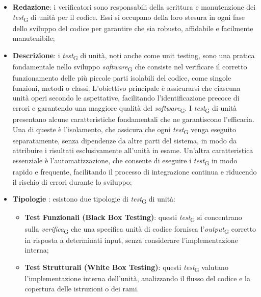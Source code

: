 \begin{itemize}
    \item \textbf{Redazione}: i verificatori sono responsabili della scrittura e manutenzione dei \textit{test}\textsubscript{G} di unità per il codice. Essi si occupano della loro stesura in ogni fase dello sviluppo del codice per garantire che sia robusto, affidabile e facilmente manutenibile;
    \item \textbf{Descrizione}: i \textit{test}\textsubscript{G} di unità, noti anche come unit testing, sono una pratica fondamentale nello sviluppo \textit{software}\textsubscript{G} che consiste nel verificare il corretto funzionamento delle più piccole parti isolabili del codice, come singole funzioni, metodi o classi. L'obiettivo principale è assicurarsi che ciascuna unità operi secondo le aspettative, facilitando l'identificazione precoce di errori e garantendo una maggiore qualità del \textit{software}\textsubscript{G}. I \textit{test}\textsubscript{G} di unità presentano alcune caratteristiche fondamentali che ne garantiscono l'efficacia. Una di queste è l'isolamento, che assicura che ogni \textit{test}\textsubscript{G} venga eseguito separatamente, senza dipendenze da altre parti del sistema, in modo da attribuire i risultati esclusivamente all'unità in esame. Un'altra caratteristica essenziale è l'automatizzazione, che consente di eseguire i \textit{test}\textsubscript{G} in modo rapido e frequente, facilitando il processo di integrazione continua e riducendo il rischio di errori durante lo sviluppo;
    \item \textbf{Tipologie} : esistono due tipologie di \textit{test}\textsubscript{G} di unità:
    \begin{itemize}
        \item \textbf{Test Funzionali (Black Box Testing)}: questi \textit{test}\textsubscript{G} si concentrano sulla \textit{verifica}\textsubscript{G} che una specifica unità di codice fornisca l'\textit{output}\textsubscript{G} corretto in risposta a determinati input, senza considerare l'implementazione interna;
        \item \textbf{Test Strutturali (White Box Testing)}: questi \textit{test}\textsubscript{G} valutano l'implementazione interna dell'unità, analizzando il flusso del codice e la copertura delle istruzioni o dei rami.
    \end{itemize}
\end{itemize}

